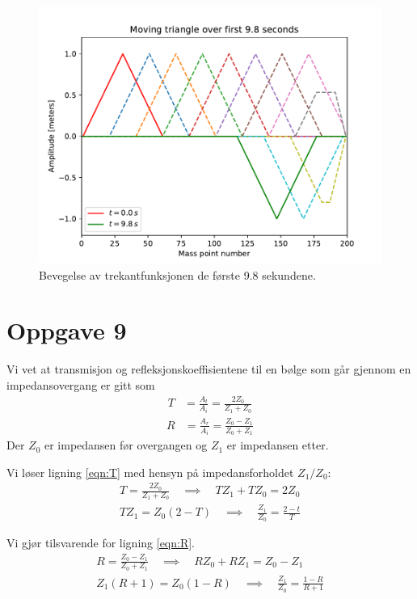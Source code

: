 \documentclass[12p,a4paper]{report}
\begin{document}
\begin{figure}[H]
\centering
\includegraphics[width=\textwidth]{../fig/moving_triangle.pdf}
\caption{Bevegelse av trekantfunksjonen de første 9.8 sekundene.}
\label{fig:tri3}
\end{figure}


\section*{Oppgave 9}
Vi vet at transmisjon og refleksjonskoeffisientene til en bølge som går gjennom en impedansovergang er gitt som
\begin{align}\label{eqn:T}
T &= \frac{A_t}{A_i} = \frac{2Z_0}{Z_1+Z_0}
\end{align}
\begin{align}\label{eqn:R}
R &= \frac{A_r}{A_i} = \frac{Z_0-Z_1}{Z_0+Z_1}
\end{align}
Der $Z_0$ er impedansen før overgangen og $Z_1$ er impedansen etter.


Vi løser ligning \ref{eqn:T} med hensyn på impedansforholdet $Z_1/Z_0$:
\begin{align*}
T = \frac{2Z_0}{Z_1+Z_0} \quad \implies \quad TZ_1 + TZ_0 = 2Z_0 \\
TZ_1 = Z_0(2-T) \quad \implies \quad \frac{Z_1}{Z_0} = \frac{2-t}{T}
\end{align*}

Vi gjør tilsvarende for ligning \ref{eqn:R}.
\begin{align*}
R = \frac{Z_0-Z_1}{Z_0+Z_1} \quad \implies \quad RZ_0 + RZ_1 = Z_0 - Z_1 \\
Z_1(R+1) = Z_0(1-R) \quad \implies \quad \frac{Z_1}{Z_0} = \frac{1-R}{R+1}
\end{align*}
\end{document}
